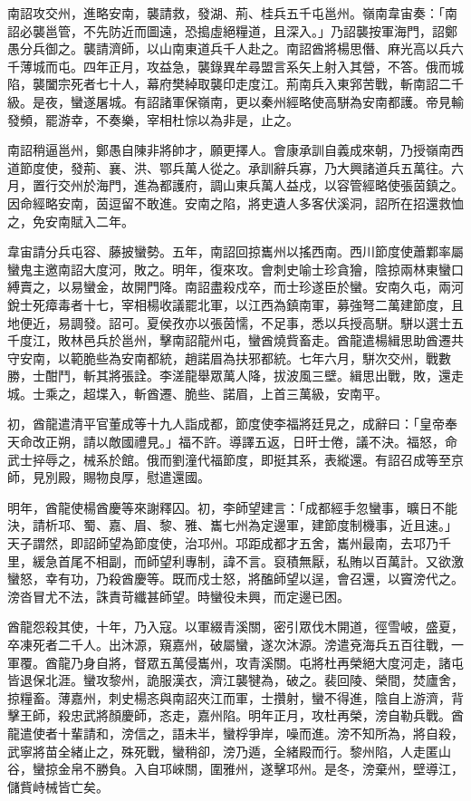 \begin{pinyinscope}
 南詔攻交州，進略安南，襲請救，發湖、荊、桂兵五千屯邕州。嶺南韋宙奏：「南詔必襲邕管，不先防近而圖遠，恐搗虛絕糧道，且深入。」乃詔襲按軍海門，詔鄭愚分兵御之。襲請濟師，以山南東道兵千人赴之。南詔酋將楊思僭、麻光高以兵六千薄城而屯。四年正月，攻益急，襲錄異牟尋盟言系矢上射入其營，不答。俄而城陷，襲闔宗死者七十人，幕府樊綽取襲印走度江。荊南兵入東郛苦戰，斬南詔二千級。是夜，蠻遂屠城。有詔諸軍保嶺南，更以秦州經略使高駢為安南都護。帝見輸發頻，罷游幸，不奏樂，宰相杜悰以為非是，止之。



 南詔稍逼邕州，鄭愚自陳非將帥才，願更擇人。會康承訓自義成來朝，乃授嶺南西道節度使，發荊、襄、洪、鄂兵萬人從之。承訓辭兵寡，乃大興諸道兵五萬往。六月，置行交州於海門，進為都護府，調山東兵萬人益戍，以容管經略使張茵鎮之。因命經略安南，茵逗留不敢進。安南之陷，將吏遺人多客伏溪洞，詔所在招還救恤之，免安南賦入二年。



 韋宙請分兵屯容、藤披蠻勢。五年，南詔回掠巂州以搖西南。西川節度使蕭鄴率屬蠻鬼主邀南詔大度河，敗之。明年，復來攻。會刺史喻士珍貪獪，陰掠兩林東蠻口縛賣之，以易蠻金，故開門降。南詔盡殺戍卒，而士珍遂臣於蠻。安南久屯，兩河銳士死瘴毒者十七，宰相楊收議罷北軍，以江西為鎮南軍，募強弩二萬建節度，且地便近，易調發。詔可。夏侯孜亦以張茵懦，不足事，悉以兵授高駢。駢以選士五千度江，敗林邑兵於邕州，擊南詔龍州屯，蠻酋燒貲畜走。酋龍遣楊緝思助酋遷共守安南，以範脆些為安南都統，趙諾眉為扶邪都統。七年六月，駢次交州，戰數勝，士酣鬥，斬其將張詮。李溠龍舉眾萬人降，拔波風三壁。緝思出戰，敗，還走城。士乘之，超堞入，斬酋遷、脆些、諾眉，上首三萬級，安南平。



 初，酋龍遣清平官董成等十九人詣成都，節度使李福將廷見之，成辭曰：「皇帝奉天命改正朔，請以敵國禮見。」福不許。導譯五返，日旰士倦，議不決。福怒，命武士捽辱之，械系於館。俄而劉潼代福節度，即挺其系，表縱還。有詔召成等至京師，見別殿，賜物良厚，慰遣還國。



 明年，酋龍使楊酋慶等來謝釋囚。初，李師望建言：「成都經手忽蠻事，曠日不能決，請析邛、蜀、嘉、眉、黎、雅、巂七州為定邊軍，建節度制機事，近且速。」天子謂然，即詔師望為節度使，治邛州。邛距成都才五舍，巂州最南，去邛乃千里，緩急首尾不相副，而師望利專制，諱不言。裒積無厭，私賄以百萬計。又欲激蠻怒，幸有功，乃殺酋慶等。既而戍士怒，將醢師望以逞，會召還，以竇滂代之。滂沓冒尤不法，誅責苛纖甚師望。時蠻役未興，而定邊已困。



 酋龍怨殺其使，十年，乃入寇。以軍綴青溪關，密引眾伐木開道，徑雪岥，盛夏，卒凍死者二千人。出沐源，窺嘉州，破屬蠻，遂次沐源。滂遣兗海兵五百往戰，一軍覆。酋龍乃身自將，督眾五萬侵巂州，攻青溪關。屯將杜再榮絕大度河走，諸屯皆退保北涯。蠻攻黎州，詭服漢衣，濟江襲犍為，破之。裴回陵、榮間，焚廬舍，掠糧畜。薄嘉州，刺史楊忞與南詔夾江而軍，士攢射，蠻不得進，陰自上游濟，背擊王師，殺忠武將顏慶師，忞走，嘉州陷。明年正月，攻杜再榮，滂自勒兵戰。酋龍遣使者十輩請和，滂信之，語未半，蠻桴爭岸，噪而進。滂不知所為，將自殺，武寧將苗全緒止之，殊死戰，蠻稍卻，滂乃遁，全緒殿而行。黎州陷，人走匿山谷，蠻掠金帛不勝負。入自邛崍關，圍雅州，遂擊邛州。是冬，滂棄州，壁導江，儲貲峙械皆亡矣。




\end{pinyinscope}
